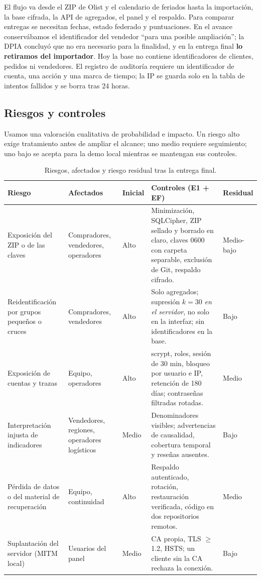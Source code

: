 El flujo va desde el ZIP de Olist y el calendario de feriados hasta la importación, la base cifrada, la API de agregados, el panel y el respaldo. Para comparar entregas se necesitan fechas, estado federado y puntuaciones. En el avance conservábamos el identificador del vendedor ``para una posible ampliación''; la DPIA concluyó que no era necesario para la finalidad, y en la entrega final \textbf{lo retiramos del importador}. Hoy la base no contiene identificadores de clientes, pedidos ni vendedores. El registro de auditoría requiere un identificador de cuenta, una acción y una marca de tiempo; la IP se guarda solo en la tabla de intentos fallidos y se borra tras 24 horas.



\subsection{Riesgos y controles}
Usamos una valoración cualitativa de probabilidad e impacto. Un riesgo alto exige tratamiento antes de ampliar el alcance; uno medio requiere seguimiento; uno bajo se acepta para la demo local mientras se mantengan sus controles.

\begin{table}[H]
\centering\footnotesize
\begin{tabularx}{\textwidth}{P{2.7cm}P{2.1cm}P{1.1cm}Y P{1.2cm}}
\toprule
Riesgo & Afectados & Inicial & Controles (E1 + EF) & Residual\\
\midrule
Exposición del ZIP o de las claves & Compradores, vendedores, operadores & Alto & Minimización, SQLCipher, ZIP sellado y borrado en claro, claves 0600 con carpeta separable, exclusión de Git, respaldo cifrado. & Medio-bajo\\
Reidentificación por grupos pequeños o cruces & Compradores, vendedores & Alto & Solo agregados; supresión $k=30$ \emph{en el servidor}, no solo en la interfaz; sin identificadores en la base. & Bajo\\
Exposición de cuentas y trazas & Equipo, operadores & Alto & scrypt, roles, sesión de 30 min, bloqueo por usuario e IP, retención de 180 días; contraseñas filtradas rotadas. & Medio\\
Interpretación injusta de indicadores & Vendedores, regiones, operadores logísticos & Medio & Denominadores visibles; advertencias de causalidad, cobertura temporal y reseñas ausentes. & Bajo\\
Pérdida de datos o del material de recuperación & Equipo, continuidad & Alto & Respaldo autenticado, rotación, restauración verificada, código en dos repositorios remotos. & Medio\\
Suplantación del servidor (MITM local) & Usuarios del panel & Medio & CA propia, TLS $\geq$ 1.2, HSTS; un cliente sin la CA rechaza la conexión. & Bajo\\
\bottomrule
\end{tabularx}
\caption{Riesgos, afectados y riesgo residual tras la entrega final.}
\end{table}

